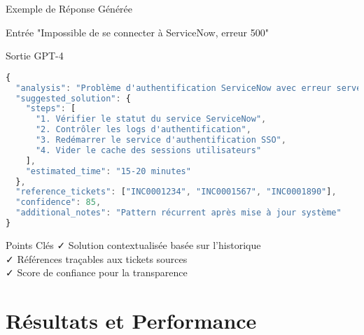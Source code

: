 \documentclass[10pt, aspectratio=169]{beamer}
\begin{document}
\begin{frame}[fragile]{Exemple de Réponse Générée}
    \begin{block}{Entrée}
        \footnotesize
        "Impossible de se connecter à ServiceNow, erreur 500"
    \end{block}
    
    \begin{block}{Sortie GPT-4}
        \begin{lstlisting}[language=JavaScript, basicstyle=\tiny\ttfamily]
{
  "analysis": "Problème d'authentification ServiceNow avec erreur serveur",
  "suggested_solution": {
    "steps": [
      "1. Vérifier le statut du service ServiceNow",
      "2. Contrôler les logs d'authentification",
      "3. Redémarrer le service d'authentification SSO",
      "4. Vider le cache des sessions utilisateurs"
    ],
    "estimated_time": "15-20 minutes"
  },
  "reference_tickets": ["INC0001234", "INC0001567", "INC0001890"],
  "confidence": 85,
  "additional_notes": "Pattern récurrent après mise à jour système"
}
        \end{lstlisting}
    \end{block}
    
    \begin{alertblock}{Points Clés}
        \footnotesize
        \faCheck{} Solution contextualisée basée sur l'historique\\
        \faCheck{} Références traçables aux tickets sources\\
        \faCheck{} Score de confiance pour la transparence
    \end{alertblock}
\end{frame}

\section{Résultats et Performance}
\end{document}
